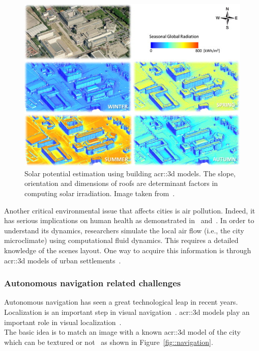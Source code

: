            \begin{figure}[htpb]
                \centering
                \includegraphics[width=.7\textwidth]{images/introduction/3d_model_applications/solar_potential}
                \caption[
                    Solar potential estimation using building \acrshort*{acr::3d} models.
                ]{
                    \label{fig::solar_potential}
                    Solar potential estimation using building \gls{acr::3d} models.
                    The slope, orientation and dimensions of roofs are determinant factors in computing solar irradiation.
                    Image taken from~\parencite{redweik2013solar}.
                }
            \end{figure}

            Another critical environmental issue that affects cities is air pollution.
            Indeed, it has serious implications on human health as demonstrated in~\textcite{pascal2013assessing} and~\textcite{chen2013evidence}.
            In order to understand its dynamics, researchers simulate the local air flow (i.e., the city microclimate) using computational fluid dynamics.
            This requires a detailed knowledge of the scenes layout.
            One way to acquire this information is through \gls{acr::3d} models of urban settlements~\parencite{ujang2013unified}.
       
        \subsubsection{Autonomous navigation related challenges}
            Autonomous navigation has seen a great technological leap in recent years.
            Localization is an important step in visual navigation~\parencite{bonin2008visual}.
            \Gls{acr::3d} models play an important role in visual localization~\parencite{biljecki2015applications,piasco2018survey}.\\
            The basic idea is to match an image with a known \gls{acr::3d} model of the city which can be textured or not~\parencite{cham2010estimating,ardeshir2014gis,arth2015instant,christie2016semantics} as shown in Figure~\ref{fig::navigation}.

